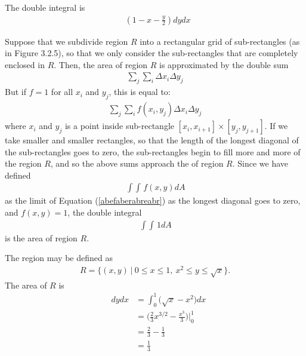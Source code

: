 \documentclass{article}
\begin{document}
The double integral is 
\begin{align*}
  \mathop{\int_{0}^{1} \! \int_0^{2-2x} } (1 - x - \frac{y}{2}) dydx
\end{align*} 
\EEN
\item %
\BEN
\item
Suppose that we subdivide region $R$ into a rectangular grid of sub-rectangles (as in Figure 3.2.5), so that we only consider the sub-rectangles that are completely enclosed in $R$. Then, the area of region $R$ is approximated by the double sum
\begin{align*}
  \sum_j\sum_i\Delta x_i \Delta y_j
\end{align*}
But if $f=1$ for all $x_i$ and $y_j$, this is equal to:
\begin{align}\label{abefaberabreabr}
  \sum_j\sum_i f(x_i,y_j) \Delta x_i \Delta y_j
\end{align}
where $x_i$ and $y_j$ is a point inside sub-rectangle $[x_i,x_{i+1}]\times[y_j,y_{j+1}]$. 
If we take smaller and smaller rectangles, so that the length of the longest diagonal of the sub-rectangles goes to zero, the sub-rectangles begin to fill more and more of the region $R$, and so the above sums approach the   of region $R$. Since we have defined
\begin{align*}
  \mathop{\int \!\!\! \int} f(x,y) dA
\end{align*}
as the limit of Equation (\ref{abefaberabreabr}) as the longest diagonal goes to zero, and $f(x,y)=1$, the double integral 
\begin{align*}
  \mathop{\int \!\!\! \int} 1 dA
\end{align*}
is the area of region $R$. 
\item The region may be defined as
\begin{align*}
  R = \{ (x,y) \ | \ 0 \le x \le 1, \ x^2 \le y \le \sqrt{x} \}.
\end{align*}
The area of $R$ is 
\begin{align*}
  \mathop{\int_0^1 \!\!\! \int_{x^2}^{\sqrt{x}}} dydx 
  &= \int_0^1 \Big(\sqrt{x} - x^2 \Big) dx \\
  &= \Big(\frac{2}{3}x^{3/2}  - \frac{x^3}{3} \Big)\Big|_0^1 \\
  &= \frac{2}{3} - \frac{1}{3} \\
  &= \frac{1}{3}
\end{align*}
\EEN
\end{document}
